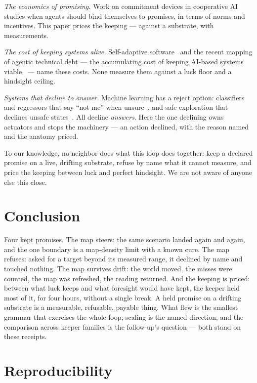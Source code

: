 \documentclass[11pt,a4paper]{article}
\begin{document}
\emph{The economics of promising.} Work on commitment devices in
cooperative AI~\cite{sun2023} studies when agents should bind
themselves to promises, in terms of norms and incentives. This paper
prices the keeping --- against a substrate, with measurements.

\emph{The cost of keeping systems alive.} Self-adaptive
software~\cite{abufouda2014,abufouda2014b} and the recent mapping of
agentic technical debt --- the accumulating cost of keeping AI-based
systems viable~\cite{tukur2026} --- name these costs. None measure
them against a luck floor and a hindsight ceiling.

\emph{Systems that decline to answer.} Machine learning has a reject
option: classifiers and regressors that say ``not me'' when
unsure~\cite{franc2021,franc2025,noskov2023}, and safe exploration
that declines unsafe states~\cite{roderick2020}. All decline
\emph{answers}. Here the one declining owns actuators and stops the
machinery --- an action declined, with the reason named and the
anatomy priced.

To our knowledge, no neighbor does what this loop does together:
keep a declared promise on a live, drifting substrate, refuse by
name what it cannot measure, and price the keeping between luck and
perfect hindsight. We are not aware of anyone else this close.

\section{Conclusion}
\label{sec:conclusion}

Four kept promises. The map steers: the same scenario landed again
and again, and the one boundary is a map-density limit with a known
cure. The map refuses: asked for a target beyond its measured range,
it declined by name and touched nothing. The map survives drift:
the world moved, the misses were counted, the map was refreshed, the
reading returned. And the keeping is priced: between what luck keeps
and what foresight would have kept, the keeper held most of it, for
four hours, without a single break. A held promise
on a drifting substrate is a measurable, refusable, payable thing.
What flew is the smallest grammar that exercises the whole loop;
scaling is the named direction, and the comparison across keeper
families is the follow-up's question --- both stand on these
receipts.

\section*{Reproducibility}
\end{document}

